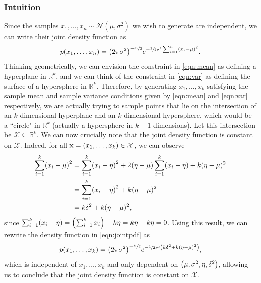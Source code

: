 \documentclass[12pt, a4paper]{article}
\newcommand{\R}{\mathbb{R}}
\DeclarePairedDelimiter \parens{(}{)}
\begin{document}
        \subsubsection{Intuition} \label{sec:2.1.1}
        Since the samples $x_1, \dots, x_n \sim \mathcal{N}(\mu, \sigma^2)$ we wish to generate are independent, we can write their joint density function as
        \begin{equation}
            \label{eqn:jointpdf}
            p(x_1, \dots, x_n) = \parens*{2\pi\sigma^2}^{-\sfrac{n}{2}}e^{-\sfrac{1}{2\sigma^2}\sum_{i = 1}^{n}\parens*{x_i - \mu}^2}.
        \end{equation}
        Thinking geometrically, we can envision the constraint in \autoref{eqn:mean} as defining a hyperplane in $\R^k$,
        and we can think of the constraint in \autoref{eqn:var} as defining the surface of a hypersphere in $\R^k$.
        Therefore, by generating $x_1, \dots, x_k$ satisfying the sample mean and sample variance conditions given by \autoref{eqn:mean} and \autoref{eqn:var} respectively,
        we are actually trying to sample points that lie on the intersection of an $k$-dimensional hyperplane and an $k$-dimensional hypersphere,
        which would be a ``circle" in $\R^k$ (actually a hypersphere in $k - 1$ dimensions).
        Let this intersection be $\mathcal{X} \subseteq \R^k$.
        We can now crucially note that the joint density function is constant on $\mathcal{X}$.
        Indeed, for all $\mathbf{x} = \parens*{x_1, \dots, x_k} \in \mathcal{X}$, we can observe
        \begin{align*}
            \sum_{i = 1}^{k}\parens*{x_i - \mu}^2 &= \sum_{i = 1}^{k}\parens*{x_i - \eta}^2 + 2(\eta - \mu)\sum_{i = 1}^{k}(x_i - \eta) + k(\eta - \mu)^2\\
            &= \sum_{i = 1}^{k}\parens*{x_i - \eta}^2 + k(\eta - \mu)^2\\
            &= k\delta^2 + k(\eta - \mu)^2,
        \end{align*}
        since $\sum_{i = 1}^{k}(x_i - \eta) = \parens*{\sum_{i = 1}^{k}x_i} - k\eta = k\eta - k\eta = 0$.
        Using this result, we can rewrite the density function in \autoref{eqn:jointpdf} as
        \begin{equation}
            \label{eqn:jointpdf+}
            p(x_1, \dots, x_k) = \parens*{2\pi\sigma^2}^{-\sfrac{k}{2}}e^{-\sfrac{1}{2\sigma^2}\parens*{k\delta^2 + k(\eta - \mu)^2}},
        \end{equation}
        which is independent of $x_1, \dots, x_k$ and only dependent on $\parens*{\mu, \sigma^2, \eta, \delta^2}$,
        allowing us to conclude that the joint density function is constant on $\mathcal{X}$.
\end{document}
